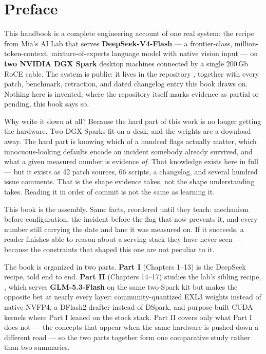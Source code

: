 \chapter*{Preface}

This handbook is a complete engineering account of one real system: the
recipe from Mia's AI Lab that serves \textbf{DeepSeek-V4-Flash} --- a frontier-class,
million-token-context, mixture-of-experts language model with native vision
input --- on \textbf{two NVIDIA DGX Spark} desktop machines connected by a
single 200\,Gb RoCE cable. The system is public: it lives in the repository
, together with
every patch, benchmark, retraction, and dated changelog entry this book draws
on. Nothing here is invented; where the repository itself marks evidence as
partial or pending, this book says so.

Why write it down at all? Because the hard part of this work is no longer
getting the hardware. Two DGX Sparks fit on a desk, and the weights are a
download away. The hard part is knowing which of a hundred flags actually
matter, which innocuous-looking defaults encode an incident somebody already
survived, and what a given measured number is evidence \emph{of}. That
knowledge exists here in full --- but it exists as 42 patch sources, 66
scripts, a changelog, and several hundred issue comments. That is the shape
evidence takes, not the shape understanding takes. Reading it in order of
commit is not the same as learning it.

This book is the assembly. Same facts, reordered until they teach: mechanism
before configuration, the incident before the flag that now prevents it,
and every number still carrying the date and lane it was measured on. If it
succeeds, a reader finishes able to reason about a serving stack they have
never seen --- because the constraints that shaped this one are not
peculiar to it.

The book is organized in two parts. \textbf{Part I} (Chapters 1--13) is the
DeepSeek recipe, told end to end. \textbf{Part II} (Chapters 14--17) studies
the lab's sibling recipe, ,
which serves \textbf{GLM-5.3-Flash} on the same two-Spark kit but makes the
opposite bet at nearly every layer: community-quantized EXL3 weights instead
of native NVFP4, a DFlash2 drafter instead of DSpark, and purpose-built CUDA
kernels where Part I leaned on the stock stack. Part II covers only what
Part I does not --- the concepts that appear when the same hardware is pushed
down a different road --- so the two parts together form one comparative
study rather than two summaries.

